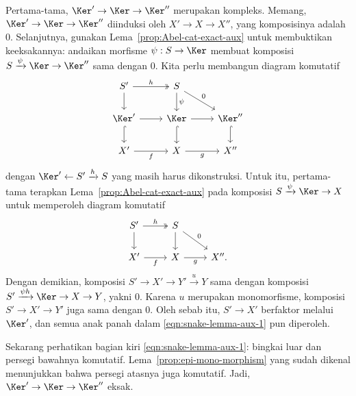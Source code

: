 \begin{bukti}
	Pertama-tama, $\Ker' \to \Ker \to \Ker''$ merupakan kompleks. Memang,
	$\Ker' \to \Ker \to \Ker''$ diinduksi oleh $X' \to X \to X''$, yang
	komposisinya adalah $0$. Selanjutnya, gunakan
	Lema~\ref{prop:Abel-cat-exact-aux} untuk
	membuktikan keeksakannya: andaikan morfisme $\psi: S \to \Ker$ membuat
	komposisi $S \xrightarrow{\psi} \Ker \to \Ker''$ sama dengan $0$.
	Kita perlu membangun diagram komutatif
	\begin{equation}\label{eqn:snake-lemma-aux-1}
	\begin{tikzcd}
			S' \arrow[twoheadrightarrow, r, "h"] \arrow[d] & S \arrow[d, "\psi"] \arrow[rd, "0"] & \\
			\Ker' \arrow[r] \arrow[hookrightarrow, d] & \Ker \arrow[hookrightarrow, d] \arrow[r] & \Ker'' \arrow[hookrightarrow, d] \\
			X' \arrow[r, "f"'] & X \arrow[r, "g"'] & X''
	\end{tikzcd}\end{equation}
	dengan $\Ker' \leftarrow S' \xrightarrow{h} S$ yang masih harus
	dikonstruksi. Untuk itu, pertama-tama terapkan
	Lema~\ref{prop:Abel-cat-exact-aux} pada komposisi
	$S \xrightarrow{\psi} \Ker \to X$ untuk memperoleh diagram komutatif
	\[\begin{tikzcd}
		S' \arrow[twoheadrightarrow, r, "h"] \arrow[d] & S \arrow[d] \arrow[rd, "0"] & \\
		X' \arrow[r, "f"'] & X \arrow[r, "g"'] & X'' .
	\end{tikzcd}\]
	Dengan demikian, komposisi $S' \to X' \to Y' \xrightarrow{u} Y$ sama
	dengan komposisi $S' \xrightarrow{\psi h} \Ker \to X \to Y$, yakni
	$0$. Karena $u$ merupakan monomorfisme, komposisi $S' \to X' \to Y'$
	juga sama dengan $0$. Oleh sebab itu, $S' \to X'$ berfaktor melalui
	$\Ker'$, dan semua anak panah dalam \eqref{eqn:snake-lemma-aux-1}
	pun diperoleh.
	
	Sekarang perhatikan bagian kiri \eqref{eqn:snake-lemma-aux-1}: bingkai
	luar dan persegi bawahnya komutatif. Lema~\ref{prop:epi-mono-morphism}
	yang sudah dikenal menunjukkan bahwa persegi atasnya juga komutatif.
	Jadi, $\Ker' \to \Ker \to \Ker''$ eksak.
	

\end{bukti}
